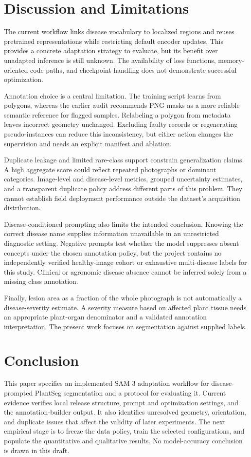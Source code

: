 \section{Discussion and Limitations}
The current workflow links disease vocabulary to localized regions and reuses pretrained representations while restricting default encoder updates. This provides a concrete adaptation strategy to evaluate, but its benefit over unadapted inference is still unknown. The availability of loss functions, memory-oriented code paths, and checkpoint handling does not demonstrate successful optimization.

Annotation choice is a central limitation. The training script learns from polygons, whereas the earlier audit recommends PNG masks as a more reliable semantic reference for flagged samples. Relabeling a polygon from metadata leaves incorrect geometry unchanged. Excluding faulty records or regenerating pseudo-instances can reduce this inconsistency, but either action changes the supervision and needs an explicit manifest and ablation.

Duplicate leakage and limited rare-class support constrain generalization claims. A high aggregate score could reflect repeated photographs or dominant categories. Image-level and disease-level metrics, grouped uncertainty estimates, and a transparent duplicate policy address different parts of this problem. They cannot establish field deployment performance outside the dataset's acquisition distribution.

Disease-conditioned prompting also limits the intended conclusion. Knowing the correct disease name supplies information unavailable in an unrestricted diagnostic setting. Negative prompts test whether the model suppresses absent concepts under the chosen annotation policy, but the project contains no independently verified healthy-image cohort or exhaustive multi-disease labels for this study. Clinical or agronomic disease absence cannot be inferred solely from a missing class annotation.

Finally, lesion area as a fraction of the whole photograph is not automatically a disease-severity estimate. A severity measure based on affected plant tissue needs an appropriate plant-organ denominator and a validated annotation interpretation. The present work focuses on segmentation against supplied labels.

\section{Conclusion}
This paper specifies an implemented SAM 3 adaptation workflow for disease-prompted PlantSeg segmentation and a protocol for evaluating it. Current evidence verifies local release structure, prompt and optimization settings, and the annotation-builder output. It also identifies unresolved geometry, orientation, and duplicate issues that affect the validity of later experiments. The next empirical stage is to freeze the data policy, train the selected configurations, and populate the quantitative and qualitative results. No model-accuracy conclusion is drawn in this draft.
